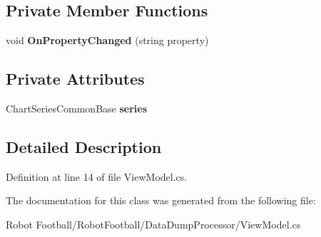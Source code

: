 \subsection*{Private Member Functions}
\begin{DoxyCompactItemize}
\item 
\hypertarget{class_data_dump_processor_1_1_series_view_model_a1721e7b1f0a700fb544f948b698905dd}{void {\bfseries On\-Property\-Changed} (string property)}\label{class_data_dump_processor_1_1_series_view_model_a1721e7b1f0a700fb544f948b698905dd}

\end{DoxyCompactItemize}
\subsection*{Private Attributes}
\begin{DoxyCompactItemize}
\item 
\hypertarget{class_data_dump_processor_1_1_series_view_model_a99ad8c0a9647fddcea8a099143f6b6fc}{Chart\-Series\-Common\-Base {\bfseries series}}\label{class_data_dump_processor_1_1_series_view_model_a99ad8c0a9647fddcea8a099143f6b6fc}

\end{DoxyCompactItemize}


\subsection{Detailed Description}


Definition at line 14 of file View\-Model.\-cs.



The documentation for this class was generated from the following file\-:\begin{DoxyCompactItemize}
\item 
Robot Football/\-Robot\-Football/\-Data\-Dump\-Processor/View\-Model.\-cs\end{DoxyCompactItemize}
